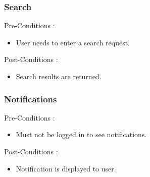\documentclass[12pt, oneside]{article}
\begin{document}
			\subsubsection{Search}
				Pre-Conditions : \begin{itemize}
							\item User needs to enter a search request.
						     \end{itemize}
				Post-Conditions : \begin{itemize}
							\item Search results are returned.
						     \end{itemize}	
			\subsubsection{Notifications}
				Pre-Conditions : \begin{itemize}
							\item Must not be logged in to see notifications.
						     \end{itemize}
				Post-Conditions : \begin{itemize}
							\item Notification is displayed to user.
						     \end{itemize}
\end{document}
